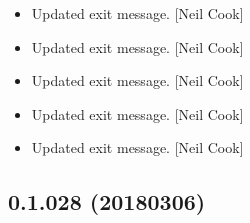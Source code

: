 \documentclass[a4paper,10pt,english]{report}
\begin{document}
\begin{itemize}
\item {} 
Updated exit message. {[}Neil Cook{]}

\item {} 
Updated exit message. {[}Neil Cook{]}

\item {} 
Updated exit message. {[}Neil Cook{]}

\item {} 
Updated exit message. {[}Neil Cook{]}

\item {} 
Updated exit message. {[}Neil Cook{]}

\end{itemize}


\subsection{0.1.028 (2018\sphinxhyphen{}03\sphinxhyphen{}06)}
\end{document}

